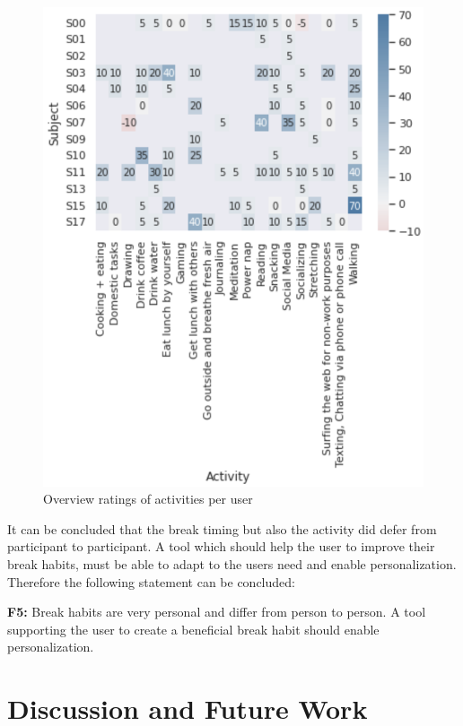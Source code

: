 \documentclass{hasel_thesis}
\begin{document}
\begin{figure}[htp]
    \centering
    \includegraphics[width=12cm]{hasel_thesis/images/activities.png}
    \caption{Overview ratings of activities per user}
    \label{fig:activity_ratings}
\end{figure}

It can be concluded that the break timing but also the activity did defer from participant to participant. A tool which should help the user to improve their break habits, must be able to adapt to the users need and enable personalization. Therefore the following statement can be concluded:

\begin{tcolorbox}[colback=white!5!white,colframe=black!75!black]
 \textbf{F5:} Break habits are very personal and differ from person to person. A tool supporting the user to create a beneficial break habit should enable personalization.
\end{tcolorbox}


\chapter{Discussion and Future Work}
\end{document}
